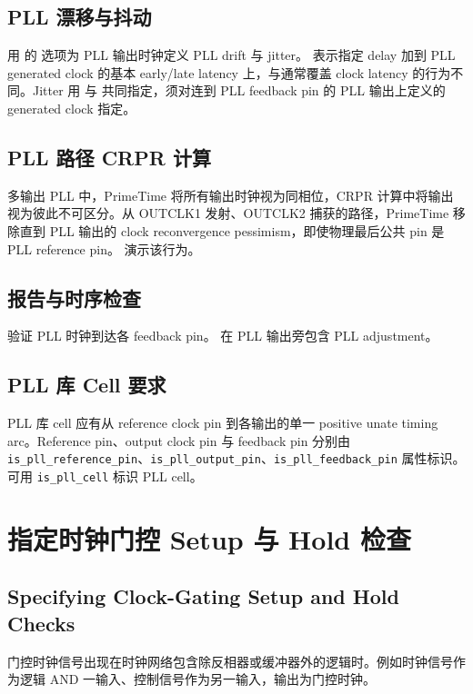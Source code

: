 \subsection{PLL 漂移与抖动}
用  的  选项为 PLL 输出时钟定义 PLL drift 与 jitter。 表示指定 delay 加到 PLL generated clock 的基本 early/late latency 上，与通常覆盖 clock latency 的行为不同。Jitter 用  与  共同指定，须对连到 PLL feedback pin 的 PLL 输出上定义的 generated clock 指定。

\subsection{PLL 路径 CRPR 计算}
多输出 PLL 中，PrimeTime 将所有输出时钟视为同相位，CRPR 计算中将输出视为彼此不可区分。从 OUTCLK1 发射、OUTCLK2 捕获的路径，PrimeTime 移除直到 PLL 输出的 clock reconvergence pessimism，即使物理最后公共 pin 是 PLL reference pin。 演示该行为。

\subsection{报告与时序检查}
 验证 PLL 时钟到达各 feedback pin。 在 PLL 输出旁包含 PLL adjustment。

\subsection{PLL 库 Cell 要求}
PLL 库 cell 应有从 reference clock pin 到各输出的单一 positive unate timing arc。Reference pin、output clock pin 与 feedback pin 分别由 \texttt{is\_pll\_reference\_pin}、\texttt{is\_pll\_output\_pin}、\texttt{is\_pll\_feedback\_pin} 属性标识。可用 \texttt{is\_pll\_cell} 标识 PLL cell。


\section{指定时钟门控 Setup 与 Hold 检查}
\subsection*{Specifying Clock-Gating Setup and Hold Checks}

门控时钟信号出现在时钟网络包含除反相器或缓冲器外的逻辑时。例如时钟信号作为逻辑 AND 一输入、控制信号作为另一输入，输出为门控时钟。

